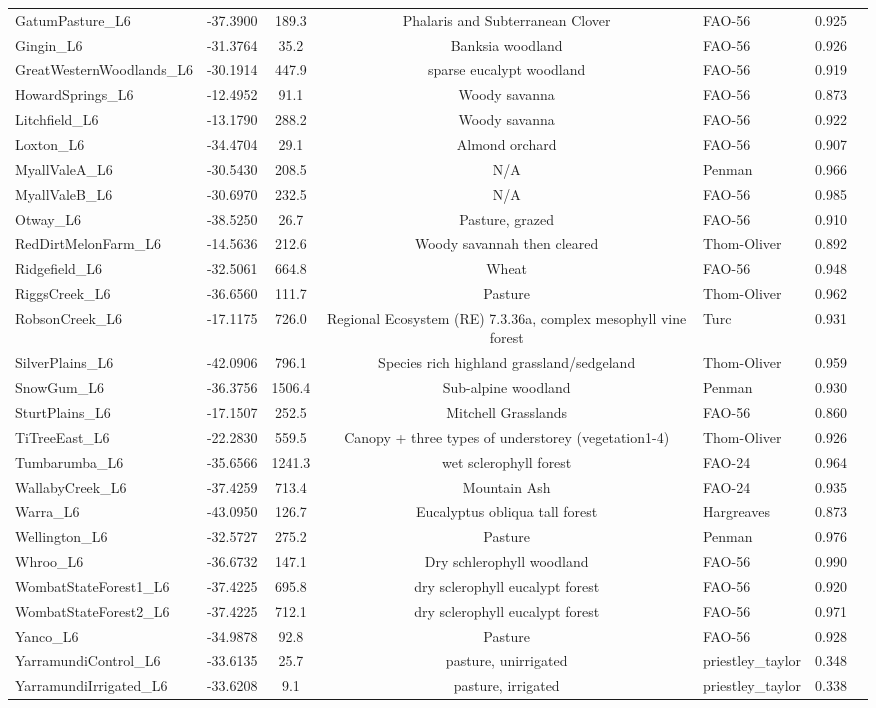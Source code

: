 \documentclass[11pt,a4paper]{article}
\begin{document}
\begin{longtable}{llccp{2.5in}cc}
GatumPasture\_L6 & -37.3900 & 189.3 & Phalaris and Subterranean Clover & FAO-56 & 0.925 \\
Gingin\_L6 & -31.3764 & 35.2 & Banksia woodland & FAO-56 & 0.926 \\
GreatWesternWoodlands\_L6 & -30.1914 & 447.9 & sparse eucalypt woodland & FAO-56 & 0.919 \\
HowardSprings\_L6 & -12.4952 & 91.1 & Woody savanna & FAO-56 & 0.873 \\
Litchfield\_L6 & -13.1790 & 288.2 & Woody savanna & FAO-56 & 0.922 \\
Loxton\_L6 & -34.4704 & 29.1 & Almond orchard & FAO-56 & 0.907 \\
MyallValeA\_L6 & -30.5430 & 208.5 & N/A & Penman & 0.966 \\
MyallValeB\_L6 & -30.6970 & 232.5 & N/A & FAO-56 & 0.985 \\
Otway\_L6 & -38.5250 & 26.7 & Pasture, grazed & FAO-56 & 0.910 \\
RedDirtMelonFarm\_L6 & -14.5636 & 212.6 & Woody savannah then cleared & Thom-Oliver & 0.892 \\
Ridgefield\_L6 & -32.5061 & 664.8 & Wheat & FAO-56 & 0.948 \\
RiggsCreek\_L6 & -36.6560 & 111.7 & Pasture & Thom-Oliver & 0.962 \\
RobsonCreek\_L6 & -17.1175 & 726.0 & Regional Ecosystem (RE) 7.3.36a, complex mesophyll vine forest & Turc & 0.931 \\
SilverPlains\_L6 & -42.0906 & 796.1 & Species rich highland grassland/sedgeland & Thom-Oliver & 0.959 \\
SnowGum\_L6 & -36.3756 & 1506.4 & Sub-alpine woodland & Penman & 0.930 \\
SturtPlains\_L6 & -17.1507 & 252.5 & Mitchell Grasslands & FAO-56 & 0.860 \\
TiTreeEast\_L6 & -22.2830 & 559.5 & Canopy + three types of understorey (vegetation1-4) & Thom-Oliver & 0.926 \\
Tumbarumba\_L6 & -35.6566 & 1241.3 & wet sclerophyll forest & FAO-24 & 0.964 \\
WallabyCreek\_L6 & -37.4259 & 713.4 & Mountain Ash & FAO-24 & 0.935 \\
Warra\_L6 & -43.0950 & 126.7 & Eucalyptus obliqua tall forest & Hargreaves & 0.873 \\
Wellington\_L6 & -32.5727 & 275.2 & Pasture & Penman & 0.976 \\
Whroo\_L6 & -36.6732 & 147.1 & Dry schlerophyll woodland & FAO-56 & 0.990 \\
WombatStateForest1\_L6 & -37.4225 & 695.8 & dry sclerophyll eucalypt forest & FAO-56 & 0.920 \\
WombatStateForest2\_L6 & -37.4225 & 712.1 & dry sclerophyll eucalypt forest & FAO-56 & 0.971 \\
Yanco\_L6 & -34.9878 & 92.8 & Pasture & FAO-56 & 0.928 \\
YarramundiControl\_L6 & -33.6135 & 25.7 & pasture, unirrigated & priestley\_taylor & 0.348 \\
YarramundiIrrigated\_L6 & -33.6208 & 9.1 & pasture, irrigated & priestley\_taylor & 0.338 \\
\end{longtable}
\newpage
\end{document}
